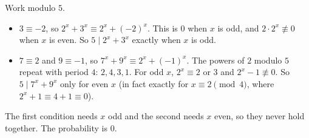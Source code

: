 Work modulo $5$.
\begin{itemize}
\item $3\equiv-2$, so $2^x+3^x\equiv2^x+(-2)^x$. This is $0$ when $x$ is odd, and $2\cdot2^x\not\equiv0$ when $x$ is even. So $5\mid2^x+3^x$ exactly when $x$ is odd.
\item $7\equiv2$ and $9\equiv-1$, so $7^x+9^x\equiv2^x+(-1)^x$. The powers of $2$ modulo $5$ repeat with period $4$: $2,4,3,1$. For odd $x$, $2^x\equiv2$ or $3$ and $2^x-1\not\equiv0$. So $5\mid7^x+9^x$ only for even $x$ (in fact exactly for $x\equiv2\pmod4$, where $2^x+1\equiv4+1\equiv0$).
\end{itemize}
The first condition needs $x$ odd and the second needs $x$ even, so they never hold together. The probability is $\boxed{0}$.
